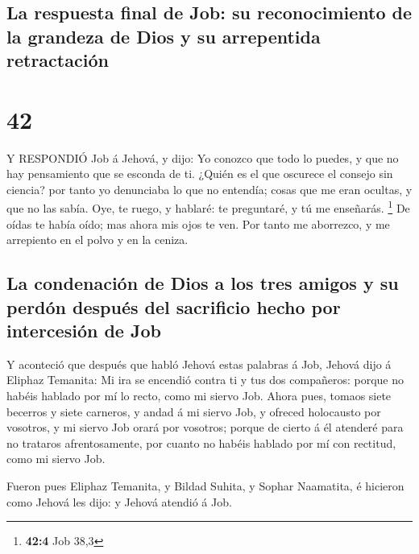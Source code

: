 \hypertarget{la-respuesta-final-de-job-su-reconocimiento-de-la-grandeza-de-dios-y-su-arrepentida-retractaciuxf3n}{%
\subsection{La respuesta final de Job: su reconocimiento de la grandeza
de Dios y su arrepentida
retractación}\label{la-respuesta-final-de-job-su-reconocimiento-de-la-grandeza-de-dios-y-su-arrepentida-retractaciuxf3n}}

\hypertarget{section-41}{%
\section{42}\label{section-41}}

 Y RESPONDIÓ Job á Jehová, y dijo:  Yo conozco
que todo lo puedes, y que no hay pensamiento que se esconda de ti.
 ¿Quién es el que oscurece el consejo sin ciencia? por tanto
yo denunciaba lo que no entendía; cosas que me eran ocultas, y que no
las sabía.  Oye, te ruego, y hablaré: te preguntaré, y tú me
enseñarás. \footnote{\textbf{42:4} Job 38,3}  De oídas te
había oído; mas ahora mis ojos te ven.  Por tanto me
aborrezco, y me arrepiento en el polvo y en la ceniza.

\hypertarget{la-condenaciuxf3n-de-dios-a-los-tres-amigos-y-su-perduxf3n-despuuxe9s-del-sacrificio-hecho-por-intercesiuxf3n-de-job}{%
\subsection{La condenación de Dios a los tres amigos y su perdón después
del sacrificio hecho por intercesión de
Job}\label{la-condenaciuxf3n-de-dios-a-los-tres-amigos-y-su-perduxf3n-despuuxe9s-del-sacrificio-hecho-por-intercesiuxf3n-de-job}}

 Y aconteció que después que habló Jehová estas palabras á
Job, Jehová dijo á Eliphaz Temanita: Mi ira se encendió contra ti y tus
dos compañeros: porque no habéis hablado por mí lo recto, como mi siervo
Job.  Ahora pues, tomaos siete becerros y siete carneros, y
andad á mi siervo Job, y ofreced holocausto por vosotros, y mi siervo
Job orará por vosotros; porque de cierto á él atenderé para no trataros
afrentosamente, por cuanto no habéis hablado por mí con rectitud, como
mi siervo Job.

 Fueron pues Eliphaz Temanita, y Bildad Suhita, y Sophar
Naamatita, é hicieron como Jehová les dijo: y Jehová atendió á Job.

